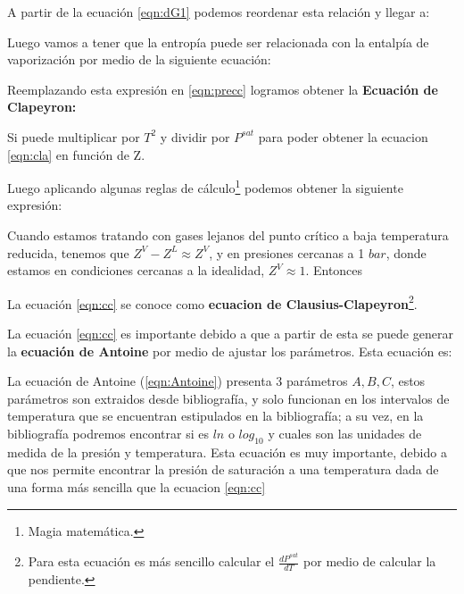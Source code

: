 
A partir de la ecuación \ref{eqn:dG1} podemos reordenar esta relación y llegar a:


Luego vamos a tener que la entropía puede ser relacionada con la entalpía de vaporización por medio de la siguiente ecuación:


Reemplazando esta expresión en \ref{eqn:precc} logramos obtener la \textbf{Ecuación de Clapeyron:}


Si puede multiplicar por $T^2$ y dividir por $P^{sat}$ para poder obtener la ecuacion \ref{eqn:cla} en función de Z.


Luego aplicando algunas reglas de cálculo\footnote{Magia matemática.} podemos obtener la siguiente expresión:


Cuando estamos tratando con gases lejanos del punto crítico a baja temperatura reducida, tenemos que $Z^V - Z^L \approx Z^V$, y en presiones cercanas a 1 $bar$, donde estamos en condiciones cercanas a la idealidad, $Z^V \approx 1$. Entonces


La ecuación \ref{eqn:cc} se conoce como \textbf{ecuacion de Clausius-Clapeyron}\footnote{Para esta ecuación es más sencillo calcular el $\frac{dP^{sat}}{dT}$ por medio de calcular la pendiente.}.

La ecuación \ref{eqn:cc} es importante debido a que a partir de esta se puede generar la \textbf{ecuación de Antoine} por medio de ajustar los parámetros.
Esta ecuación es:


La ecuación de Antoine (\ref{eqn:Antoine}) presenta 3 parámetros $A,B,C$, estos parámetros son extraidos desde bibliografía, y solo funcionan en los intervalos de temperatura que se encuentran estipulados en la bibliografía; a su vez, en la bibliografía podremos encontrar si es $ln$ o $log_{10}$ y cuales son las unidades de medida de la presión y temperatura.
Esta ecuación es muy importante, debido a que nos permite encontrar la presión de saturación a una temperatura dada de una forma más sencilla que la ecuacion \ref{eqn:cc}

